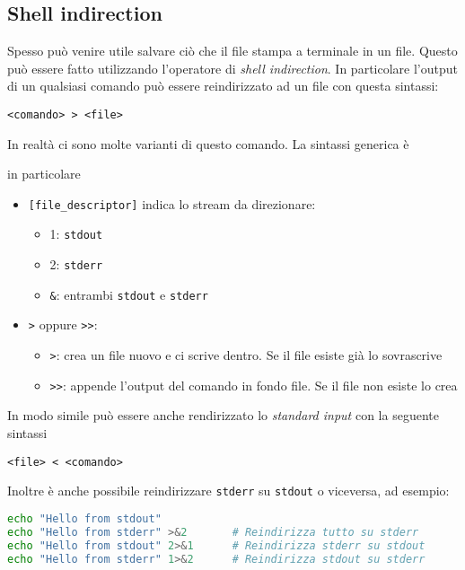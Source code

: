 \subsection{Shell indirection}\label{shell indirection}
Spesso può venire utile salvare ciò che il file stampa a terminale in un file. Questo può essere fatto utilizzando l'operatore di \textit{shell indirection}. In particolare l'output di un qualsiasi comando può essere reindirizzato ad un file con questa sintassi:
\begin{center}
	\verb|<comando> > <file>|
\end{center}
In realtà ci sono molte varianti di questo comando. La sintassi generica è
\begin{center}
\end{center}
in particolare
\begin{itemize}
	\item \verb|[file_descriptor]| indica lo stream da direzionare:
	      \begin{itemize}
		      \item 1:  \verb|stdout|
		      \item 2:  \verb|stderr|
		      \item \verb|&|:  entrambi \verb|stdout| e \verb|stderr|
	      \end{itemize}
	\item \verb|>| oppure \verb|>>|:
	      \begin{itemize}
		      \item \verb|>|: crea un file nuovo e ci scrive dentro. Se il file esiste già lo sovrascrive
		      \item \verb|>>|: appende l'output del comando in fondo file. Se il file non esiste lo crea
	      \end{itemize}
\end{itemize}
In modo simile può essere anche rendirizzato lo \textit{standard input} con la seguente sintassi
\begin{center}
	\verb|<file> < <comando>|
\end{center}
Inoltre è anche possibile reindirizzare \verb|stderr| su \verb|stdout| o viceversa, ad esempio:
\begin{lstlisting}[language = bash]
echo "Hello from stdout"
echo "Hello from stderr" >&2       # Reindirizza tutto su stderr
echo "Hello from stdout" 2>&1      # Reindirizza stderr su stdout
echo "Hello from stderr" 1>&2      # Reindirizza stdout su stderr
\end{lstlisting}


